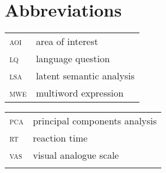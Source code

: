 \documentclass[output=paper,modfonts,nonflat]{langsci/langscibook}
\begin{document}
 
\section*{Abbreviations}



\begin{tabularx}{.48\textwidth}{ll}
\textsc{aoi} & area of interest  \\
\textsc{lq} & language question   \\
\textsc{lsa} & latent semantic analysis  \\
\textsc{mwe} & multiword expression \\
\end{tabularx}
\begin{tabularx}{.48\textwidth}{ll}
\textsc{pca} & principal components analysis  \\
\textsc{rt} & reaction time   \\
\textsc{vas} & visual analogue scale   \\
\\
\end{tabularx}


\newpage  
\end{document}
